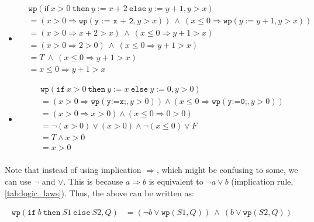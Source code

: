 \documentclass[oneside,11pt,dvipsnames]{book}
\renewcommand{\implies}{\Rightarrow}
\newcommand{\code}[1]{\texttt{#1}}
\begin{document}
\begin{itemize}
    \item
\begin{equation*}
\begin{split}
& \code{wp}(\text{if} ~x > 0~ \code{then} ~y := x + 2 ~\code{else} ~y := y + 1,  y > x)  \\
& = (x > 0 \implies \code{wp}(\code{y := x + 2}, y > x)) ~\land~ (x\le 0 \implies \code{wp}(y := y + 1, y > x))\\
& = (x > 0 \implies x + 2 > x)  ~\land~  (x \le 0 \implies y + 1 > x)\\
& = (x > 0 \implies 2 > 0)      ~\land~  (x \le 0 \implies y + 1 > x)\\
& =     T           ~\land~  (x \le 0 \implies y + 1 > x)\\
& =            x \le 0 \implies y + 1 > x
\end{split}
\end{equation*}
    \item
\begin{equation*}
\begin{split}
& \code{wp}(\code{if} ~x > 0~ \code{then} ~y := x~  \code{else} ~y:= 0,  y > 0)\\
& = (x>0 \implies \code{wp}(\code{y:=x;}, y >0)) \land (x\le 0 \implies \code{wp}(\code{y:=0;}, y>0))\\
& = (x > 0 \implies x > 0)      \land  (x \le 0  \implies  0 > 0)\\
& = \neg(x > 0) \lor (x > 0)   \land  \neg(x \le 0) \lor F\\
& =       T         \land         x > 0   \\
& =                    x > 0\\  
\end{split}
\end{equation*}
\end{itemize}

Note that instead of using implication $\implies$, which might be confusing to some, we can use $\neg$ and $\lor$. This is because $a \implies b$ is equivalent to $\neg a \lor b$ (implication rule, \autoref{tab:logic_laws}). Thus, the above can be written as:

\begin{equation}\label{eq:wp-conditional2}
    \begin{split}
        \code{wp}(\code{if}~b~\code{then}~S1~\code{else}~S2, Q)  &=  (\neg b \lor \code{wp}(S1,Q))  ~\land~  (b \lor \code{wp}(S2, Q))    
    \end{split}
\end{equation}
\end{document}

